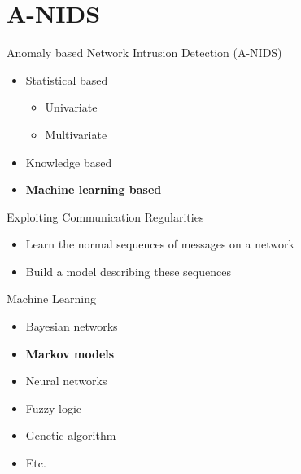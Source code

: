 \section{A-NIDS}

\begin{frame}Anomaly based Network Intrusion Detection (A-NIDS)

\begin{itemize}
	\item Statistical based
		\begin{itemize}
			\item Univariate
			\item Multivariate
		\end{itemize}
	\item Knowledge based
	\item \textbf{Machine learning based}
\end{itemize}
\end{frame}

\begin{frame}Exploiting Communication Regularities

\begin{itemize}
	\item Learn the normal sequences of messages on a network
	\item Build a model describing these sequences
\end{itemize}
\end{frame}

\begin{frame}Machine Learning

\begin{itemize}
	\item Bayesian networks
	\item \textbf{Markov models}
	\item Neural networks
	\item Fuzzy logic
	\item Genetic algorithm
	\item Etc.
\end{itemize}	
\end{frame}


